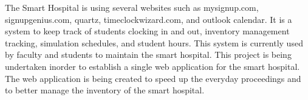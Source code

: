 	The Smart Hospital is using several websites such as mysignup.com, signupgenius.com, quartz, timeclockwizard.com, and outlook calendar. It is a system to keep track of students clocking in and out, inventory management tracking, simulation schedules, and student hours. This system is currently used by faculty and students to maintain the smart hospital. 
	This project is being undertaken inorder to establish a single web application for the smart hospital. The web application is being created to speed up the everyday proceedings and to better manage the inventory of the smart hospital.